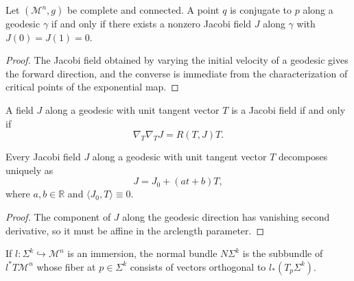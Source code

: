 \begin{proposition}
\label{appb-prop-jacobi-characterizes-conjugacy}


Let $(\mathcal M^n,g)$ be complete and connected. A point $q$ is conjugate to $p$ along a geodesic $\gamma$ if and only if there exists a nonzero Jacobi field $J$ along $\gamma$ with $J(0)=J(1)=0$.
\end{proposition}

\begin{proof}
\sketch The Jacobi field obtained by varying the initial velocity of a geodesic gives the forward direction, and the converse is immediate from the characterization of critical points of the exponential map.
\end{proof}

\begin{lemma}
\label{appb-lem-jacobi-equation}


A field $J$ along a geodesic with unit tangent vector $T$ is a Jacobi field if and only if
\[
\nabla_T\nabla_T J = R(T,J)T.
\]
\end{lemma}

\begin{corollary}
\label{appb-cor-jacobi-orthogonal-decomposition}


Every Jacobi field $J$ along a geodesic with unit tangent vector $T$ decomposes uniquely as
\[
J = J_0 + (at+b)T,
\]
where $a,b\in\mathbb R$ and $\langle J_0,T\rangle\equiv 0$.
\end{corollary}

\begin{proof}
\sketch The component of $J$ along the geodesic direction has vanishing second derivative, so it must be affine in the arclength parameter.
\end{proof}

\begin{definition}
\label{appb-def-normal-bundle}

If $l:\Sigma^k\hookrightarrow \mathcal M^n$ is an immersion, the normal bundle $N\Sigma^k$ is the subbundle of $l^*T\mathcal M^n$ whose fiber at $p\in\Sigma^k$ consists of vectors orthogonal to $l_*(T_p\Sigma^k)$.
\end{definition}


